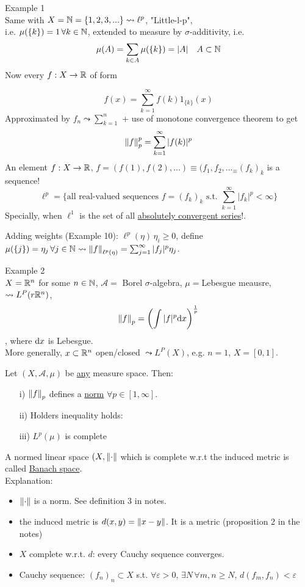\documentclass{article}
\begin{document}
Example 1\\
Same with $X=\mathbb{N}=\{1,2,3,...\}\mathrel{\leadsto} \ell^p$, "Little-l-p",\\
i.e. $\mu(\{k\})=1\,\forall k\in\mathbb{N}$, extended to measure by $\sigma$-additivity, i.e.
$$
	\mu(A)=\sum_{k\in A} \mu(\{k\})=|A|\quad A\subset \mathbb{N}
$$
Now every $f:X\to \mathbb{R} $ of form

$$f(x)=\sum_{k=1}^\infty f(k)1_{\{k\}}(x)$$
Approximated by $f_n\mathrel{\leadsto}\sum_{k=1}^n$ + use of monotone convergence theorem to get
$$\left\|{f}\right\|_p^p=\sum_{k=1}^\infty |f(k)|^p$$
An element $f:X\to \mathbb{R}$, $f=(f(1),f(2),...)\equiv(f_1,f_2,..._\equiv(f_k)_k$ is a sequence!
$$\ell^p=
	\{
	\text{all real-valued sequences }
	f=(f_k)_k
	\text{ s.t. }
	\sum_{k=1}^\infty|f_k|^p<\infty
	\}$$
Specially, when $\ell^1$ is the set of all \underline{absolutely convergent series}!.
\begin{remark}
	Adding weights (Example 10): $\ell^p(\eta)\,\eta_i\geq0$, define $\mu(\{j\})=\eta_j\,\forall j\in\mathbb{N}\mathrel{\leadsto}\left\|{f}\right\|_{\ell^p(\eta)}=\sum_{j=1}^\infty|f_j|^p\eta_j$.
\end{remark}

Example 2\\
$X=\mathbb{R}^n$ for some $n\in\mathbb{N}$, $\mathcal{A}=$ Borel $\sigma$-algebra, $\mu=$Lebesgue meausre, $\mathrel{\leadsto}L^P(r\mathbb{R}^n)$,
$$\left\|{f}\right\|_p=\left(\int|f|^p{\rm d}x\right)^\frac{1}{p}$$,
where ${\rm{d}}x$ is Lebesgue. \\
More generally, $x\subset \mathbb{R}^n$ open/closed $\mathrel{\leadsto} L^P(X)$, e.g. $n=1$, $X=[0,1]$.



\begin{theorem}
	Let $(X,\mathcal{A},\mu)$ be {\underline {any}} measure space. Then:
	\begin{itemize}
		\item [i)] $\left\|{f}\right\|_p$ defines a \underline{norm} $\forall p\in[1,\infty]$.
		\item [ii)] Holders inequality holds:\inc
		\item [iii)] $L^p(\mu)$ is complete
	\end{itemize}
\end{theorem}

\begin{definition}
	A normed linear space $(X,\left\|{\cdot}\right\|$ which is complete w.r.t the induced metric is called \underline{Banach space}.\\
	Explanation:
	\begin{itemize}
		\item $\left\|{\cdot}\right\|$ is a norm. See definition 3 in notes.
		\item the induced metric is $d(x,y)=\left\|{x-y}\right\|$. It is a metric (proposition 2 in the notes) %
		\item $X$ complete w.r.t. $d$: every Cauchy sequence converges.
		\item Cauchy sequence: $(f_n)_n\subset X$ s.t. $\forall \varepsilon>0,\,\exists N\,\forall m,n\geq N,\,d(f_m,f_n)<\varepsilon$
	\end{itemize}
\end{definition}
\end{document}
